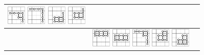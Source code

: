 \documentclass[runningheads]{llncs}
\begin{document}
\begin{tabular}{p{1.2cm}l@{~~}r}
\includegraphics[width=0.9cm]{figures/NTuple-74.pdf}
\includegraphics[width=0.9cm]{figures/NTuple-75.pdf}
\includegraphics[width=0.9cm]{figures/NTuple-76.pdf}
\includegraphics[width=0.9cm]{figures/NTuple-77.pdf}
& \raisebox{10pt}{$\begin{array}{r}
 \mbox{2-VSE, 2 stages}\\
471\,794\,736
 \end{array}$}
\\\hline
\raisebox{15pt}{\textsf{NT8}}
&
\includegraphics[width=0.9cm]{figures/NTuple-80.pdf}
\includegraphics[width=0.9cm]{figures/NTuple-81.pdf}
\includegraphics[width=0.9cm]{figures/NTuple-82.pdf}
\includegraphics[width=0.9cm]{figures/NTuple-83.pdf}
\includegraphics[width=0.9cm]{figures/NTuple-84.pdf}
& \raisebox{10pt}{$\begin{array}{r}
 \mbox{3-VSE, 2 stages}\\
877\,730\,580
 \end{array}$}

\end{tabular}
\end{document}
